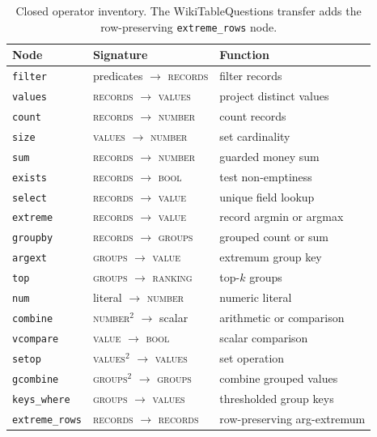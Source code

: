 \documentclass{article}
\begin{document}
\begin{table}[h]
\centering
\caption{Closed operator inventory. The WikiTableQuestions transfer adds the
row-preserving \texttt{extreme\_rows} node.}
\label{tab:algebra}
\small
\begin{tabular}{lll}
\toprule
Node & Signature & Function \\
\midrule
\texttt{filter} & predicates $\to$ \textsc{records} & filter records \\
\texttt{values} & \textsc{records} $\to$ \textsc{values} & project distinct values \\
\texttt{count} & \textsc{records} $\to$ \textsc{number} & count records \\
\texttt{size} & \textsc{values} $\to$ \textsc{number} & set cardinality \\
\texttt{sum} & \textsc{records} $\to$ \textsc{number} & guarded money sum \\
\texttt{exists} & \textsc{records} $\to$ \textsc{bool} & test non-emptiness \\
\texttt{select} & \textsc{records} $\to$ \textsc{value} & unique field lookup \\
\texttt{extreme} & \textsc{records} $\to$ \textsc{value} & record argmin or argmax \\
\texttt{groupby} & \textsc{records} $\to$ \textsc{groups} & grouped count or sum \\
\texttt{argext} & \textsc{groups} $\to$ \textsc{value} & extremum group key \\
\texttt{top} & \textsc{groups} $\to$ \textsc{ranking} & top-$k$ groups \\
\texttt{num} & literal $\to$ \textsc{number} & numeric literal \\
\texttt{combine} & \textsc{number}$^2$ $\to$ scalar & arithmetic or comparison \\
\texttt{vcompare} & \textsc{value} $\to$ \textsc{bool} & scalar comparison \\
\texttt{setop} & \textsc{values}$^2$ $\to$ \textsc{values} & set operation \\
\texttt{gcombine} & \textsc{groups}$^2$ $\to$ \textsc{groups} & combine grouped values \\
\texttt{keys\_where} & \textsc{groups} $\to$ \textsc{values} & thresholded group keys \\
\texttt{extreme\_rows} & \textsc{records} $\to$ \textsc{records} & row-preserving arg-extremum \\
\bottomrule
\end{tabular}
\end{table}
\end{document}
